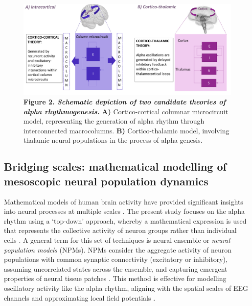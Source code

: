 \documentclass[12pt,twoside]{article}
\begin{document}
\begin{figure}[H]
    \centering
    \includegraphics[scale=0.45]{Images/Fig2__Theories.png}
    \caption*{\textbf{Figure 2. \textit{Schematic depiction of two candidate theories of alpha rhythmogenesis.}} \textbf{A)} Cortico-cortical columnar microcircuit model, representing the generation of alpha rhythm through interconnected macrocolumns. \textbf{B)} Cortico-thalamic model, involving thalamic neural populations in the process of alpha genesis.}
    \label{fig:Theories}
\end{figure}
\vspace{-\baselineskip} 
\subsection{Bridging scales: mathematical modelling of mesoscopic neural population dynamics}

Mathematical models of human brain activity have provided significant insights into neural processes at multiple scales \citep{deco2008dynamic}. The present study focuses on the alpha rhythm using a `top-down' approach, whereby a mathematical expression is used that represents the collective activity of neuron groups rather than individual cells \citep{cook2021neural, cooray2023global}. A general term for this set of techniques is neural ensemble or \textit{neural population models} (NPMs). NPMs consider the aggregate activity of neuron populations with common synaptic connectivity (excitatory or inhibitory), assuming uncorrelated states across the ensemble, and capturing emergent properties of neural tissue patches \citep{breakspear2017dynamic}. This method is effective for modelling oscillatory activity like the alpha rhythm, aligning with the spatial scales of EEG channels and approximating local field potentials \citep{coombes2014neural, evertz2022alpha}. 
\end{document}
